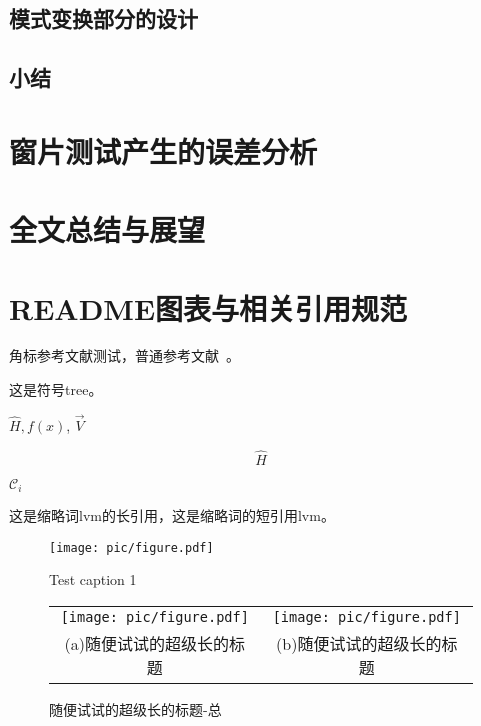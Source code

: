 \documentclass[master]{thesis-uestc}
\begin{document}
\section{模式变换部分的设计}
\section{小结}
\chapter{窗片测试产生的误差分析}
\chapter{全文总结与展望}
\chapter{README图表与相关引用规范}

角标参考文献测试，普通参考文献~\cite{clerc2010discrete}。

这是符号\gls{tree}\cite{liuxf2006}。

$\hat{H}, f(x)$, $\vec{V}$

$$\hat{H}$$

$\mathcal{C}_i$

这是缩略词\acrlong{lvm}的长引用，这是缩略词的短引用\acrshort{lvm}。

\begin{figure}[!htb]
    \texttt{[image: pic/figure.pdf]}
    \caption[short catption 1]{Test caption 1}
\end{figure}


\begin{figure}[!htb]
    \small
    \centering
    \begin{tabular}{@{\ }c@{\ }c}
        \texttt{[image: pic/figure.pdf]} & 
        \hspace{5pt}
        \texttt{[image: pic/figure.pdf]}     \\
        \mbox{\small (a)随便试试的超级长的标题}                                                                               & 
        \mbox{\small (b)随便试试的超级长的标题}                                                                                  \\
    \end{tabular}
    \caption{随便试试的超级长的标题-总}
    \label{fig:test}
\end{figure}
\end{document}
